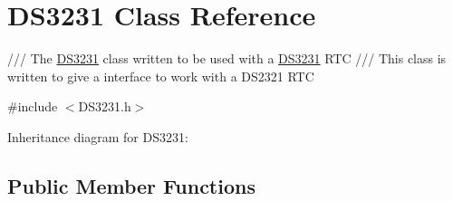 \hypertarget{classDS3231}{}\section{D\+S3231 Class Reference}
\label{classDS3231}


/// The \hyperlink{classDS3231}{D\+S3231} class written to be used with a \hyperlink{classDS3231}{D\+S3231} R\+TC  /// This class is written to give a interface to work with a D\+S2321 R\+TC  




{\ttfamily \#include $<$D\+S3231.\+h$>$}



Inheritance diagram for D\+S3231\+:
\subsection*{Public Member Functions}
